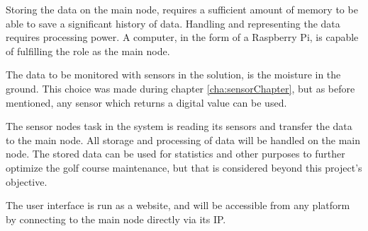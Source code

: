Storing the data on the main node, requires a sufficient amount of memory to be able to save a significant history of data. Handling and representing the data requires processing power. A computer, in the form of a Raspberry Pi, is capable of fulfilling the role as the main node. 

The data to be monitored with sensors in the solution, is the moisture in the ground. This choice was made during chapter \ref{cha:sensorChapter}, but as before mentioned, any sensor which returns a digital value can be used.

The sensor nodes task in the system is reading its sensors and transfer the data to the main node. All storage and processing of data will be handled on the main node.
The stored data can be used for statistics and other purposes to further optimize the golf course maintenance, but that is considered beyond this project's objective.

The user interface is run as a website, and will be accessible from any platform by connecting to the main node directly via its IP.